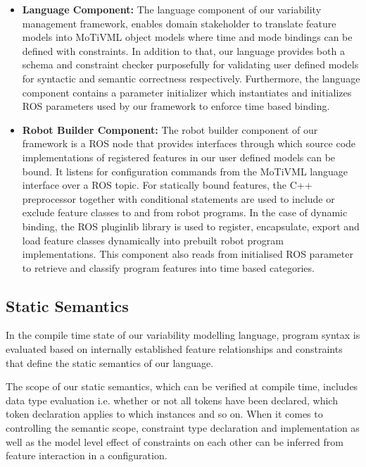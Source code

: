 \documentclass[conference]{IEEEtran}
\begin{document}
\begin{itemize}
	\item \textbf{Language Component: }
	The language component of our variability management framework, enables domain stakeholder to translate feature models into MoTiVML object models where time and mode bindings can be defined with constraints. In addition to that, our language provides both a schema and constraint checker purposefully for validating user defined models for syntactic and semantic correctness respectively. Furthermore, the language component contains a parameter initializer which instantiates and initializes ROS parameters used by our framework to enforce time based binding.
	\item \textbf{Robot Builder Component: }
	The robot builder component of our framework is a ROS node that provides interfaces through which source code implementations of registered features in our user defined models can be bound. It listens for configuration commands from the MoTiVML language interface over a ROS topic. For statically bound features, the C++ preprocessor together with conditional statements are used to include or exclude feature classes to and from robot programs.  In the case of dynamic binding, the ROS pluginlib library is used to register, encapsulate, export and load feature classes dynamically into prebuilt robot program implementations. This component also reads from initialised ROS parameter to retrieve and classify program features into time based categories. 
\end{itemize}


\subsection{Static Semantics}
In the compile time state of our variability modelling language, program syntax is evaluated based on internally established feature relationships and constraints that define the static semantics of our language.

The scope of our static semantics, which can be verified  at compile time, includes data type evaluation i.e.  whether or not all tokens have been declared, which token declaration applies to which instances and so on. When it comes to controlling the semantic scope, constraint type declaration and implementation as well as the model level effect of constraints on each other can be inferred from feature interaction in a configuration.
\end{document}
